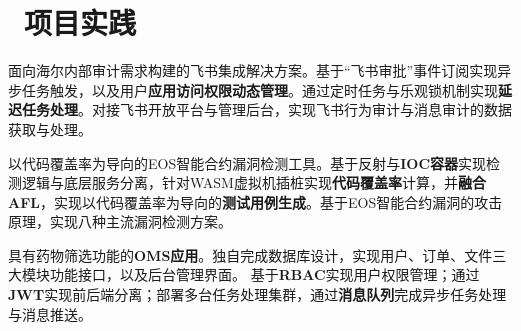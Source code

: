 \documentclass{resume}
\begin{document}


\section{\faUsers\ 项目实践}

  \begin{onehalfspacing}
    面向海尔内部审计需求构建的飞书集成解决方案。基于“飞书审批”事件订阅实现异步任务触发，以及用户\textbf{应用访问权限动态管理}。通过定时任务与乐观锁机制实现\textbf{延迟任务处理}。对接飞书开放平台与管理后台，实现飞书行为审计与消息审计的数据获取与处理。
  \end{onehalfspacing}

  \begin{onehalfspacing}
    以代码覆盖率为导向的EOS智能合约漏洞检测工具。基于反射与\textbf{IOC容器}实现检测逻辑与底层服务分离，针对WASM虚拟机插桩实现\textbf{代码覆盖率}计算，并\textbf{融合AFL}，实现以代码覆盖率为导向的\textbf{测试用例生成}。基于EOS智能合约漏洞的攻击原理，实现八种主流漏洞检测方案。
  \end{onehalfspacing}

  \begin{onehalfspacing}
    具有药物筛选功能的\textbf{OMS应用}。独自完成数据库设计，实现用户、订单、文件三大模块功能接口，以及后台管理界面。
    基于\textbf{RBAC}实现用户权限管理；通过\textbf{JWT}实现前后端分离；部署多台任务处理集群，通过\textbf{消息队列}完成异步任务处理与消息推送。
  \end{onehalfspacing}
\end{document}
